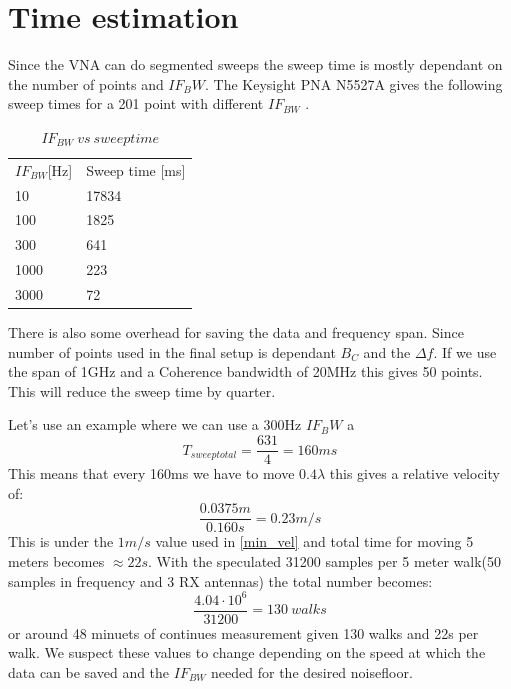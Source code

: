 \section{Time estimation}
Since the \gls{VNA} can do segmented sweeps the sweep time is mostly dependant on the number of points and $IF_BW$.
The Keysight PNA N5527A gives the following sweep times for a 201 point with different $IF_{BW}$ \citep{Key_PNA}. \\

\begin{table}[H]
\centering
\caption{$IF_{BW} \ vs \ sweep time$}
\label{my-label}
\begin{tabular}{l|l}
\hline
$IF_{BW}${[}Hz{]} & Sweep time {[}ms{]} \\
10              & 17834               \\
100             & 1825                \\
300             & 641                 \\
1000            & 223                 \\
3000            & 72                 
\end{tabular}
\end{table}

There is also some overhead for saving the data and frequency span. Since number of points used in the final setup is dependant $B_C$ and the $\Delta f$. If we use the span of 1GHz and a Coherence bandwidth of 20MHz this gives 50 points. This will reduce the sweep time by quarter.

Let's  use an example where we can use a 300Hz $IF_BW$ a
\begin{equation}
T_{sweep total} = \frac{631}{4} = 160ms
\end{equation}
This means that every 160ms we have to move $0.4 \lambda$ this gives a relative velocity of:
\begin{equation}
\frac{0.0375m}{0.160s} = 0.23 m/s
\end{equation}
This is under the $1m/s$ value used in \autoref{min_vel}
and total time for moving 5 meters becomes $\approx 22s$.
With the speculated 31200 samples per 5 meter walk(50 samples in frequency and 3 RX antennas) the total number becomes:
\begin{equation}
\frac{4.04 \cdot 10^6}{31200} = 130 \ walks
\end{equation}
or around 48 minuets of continues measurement given 130 walks and 22s per walk. We suspect these values to change depending on the speed at which the data can be saved and the $IF_{BW}$ needed for the desired noisefloor.

